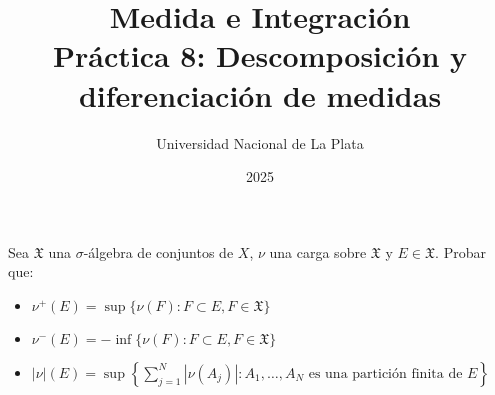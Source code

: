 \documentclass[12pt]{article}
\title{Medida e Integración \\ Práctica 8: Descomposición y diferenciación de medidas}
\author{Universidad Nacional de La Plata}
\date{2025}
\newenvironment{statement}[2][Ejercicio]{\begin{trivlist}
\item[\hskip \labelsep {\bfseries #1}\hskip \labelsep {\bfseries #2.}]}{\end{trivlist}}
\begin{document}
\maketitle

\begin{statement}{1}
    Sea $\mathfrak{X}$ una $\sigma$-álgebra de conjuntos de $X$, $\nu$ una carga sobre $\mathfrak{X}$ y $E \in \mathfrak{X}$. Probar que:
    \begin{itemize}
        \item[(a)] $\nu^+(E) = \sup\{\nu(F) : F \subset E, F \in \mathfrak{X}\}$
        \item[(b)] $\nu^-(E) = -\inf\{\nu(F) : F \subset E, F \in \mathfrak{X}\}$
        \item[(c)] $|\nu|(E) = \sup\left\{\sum_{j=1}^{N} |\nu(A_j)| : A_1, \ldots, A_N \text{ es una partición finita de } E \right\}$
    \end{itemize}
\end{statement}
\end{document}
